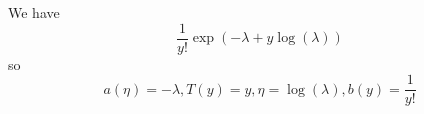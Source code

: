 \begin{answer}
We have
\[ \frac{1}{y!}\exp(-\lambda+y\log(\lambda)) \]
so \[ a(\eta)=-\lambda, T(y)=y, \eta=\log(\lambda), b(y)=\frac{1}{y!} \]
\end{answer}
